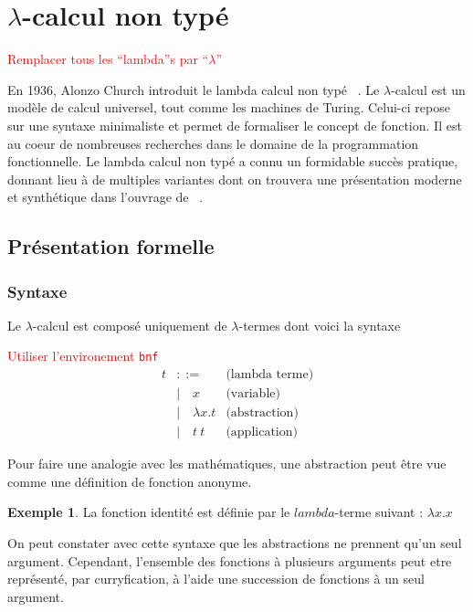 \documentclass {article}
\theoremstyle{definition}
\newtheorem{example}{Exemple}
\theoremstyle{remark}
\newcommand{\todo}[1]{\textcolor{red}{#1}}
\begin{document}
\section{$\lambda$-calcul non typé}
\label{sec:untyped}

\todo{Remplacer tous les ``lambda''s par ``$\lambda$''}

En 1936, Alonzo Church introduit le lambda calcul non typé
~\citep{church:lambda-calcul}. Le $\lambda$-calcul est
un modèle de calcul universel, tout comme les machines de Turing. Celui-ci repose
sur une syntaxe minimaliste et permet de formaliser le concept de fonction. Il est au coeur de nombreuses recherches dans le domaine de la 
programmation fonctionnelle. Le lambda calcul non typé a connu un formidable 
succès pratique, donnant lieu à de multiples variantes dont on trouvera une présentation
 moderne et synthétique dans l'ouvrage de ~\citet{pierce:tapl}.


\subsection{Présentation formelle}

\subsubsection{Syntaxe}
Le $\lambda$-calcul est composé uniquement de \(\lambda\)-termes dont voici la syntaxe

\newcommand{\Lam}[2]{\ensuremath{\lambda #1. #2}}
\newcommand{\App}[2]{\ensuremath{#1\:#2}}
\newcommand{\Var}[1]{\ensuremath{#1}}

\todo{Utiliser l'environement \texttt{bnf}}
\begin{align*}
  t &::= & \mbox{(lambda terme)} \\
  &|\quad \Var{x} & \mbox{(variable)} \\
  &|\quad \Lam{x}{t} & \mbox{(abstraction)} \\
  &|\quad \App{t}{t}          & \mbox{(application)}
\end{align*}

Pour faire une analogie avec les mathématiques, une abstraction peut
être vue comme une définition de fonction anonyme.
 
\begin{example}
 La fonction identité est définie par le $lambda$-terme suivant : $\Lam{x}{\Var{x}}$
\end{example}

On peut constater avec cette syntaxe que les abstractions ne prennent
qu'un seul argument. Cependant, l'ensemble des fonctions à plusieurs
arguments peut etre représenté, par curryfication, à l'aide une
succession de fonctions à un seul argument.
\end{document}
